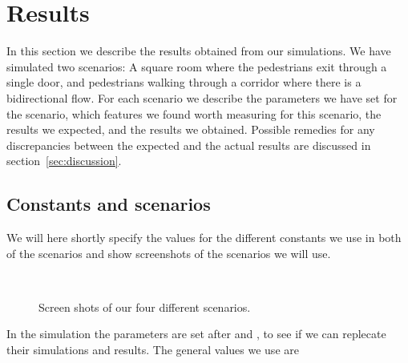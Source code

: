 \section{Results}
\label{sec:results}
In this section we describe the results obtained from our simulations. 
We have simulated two scenarios: A square room where the pedestrians 
exit through a single door, and pedestrians walking through a corridor 
where there is a bidirectional flow. For each scenario we describe the 
parameters we have set for the scenario, which features we found worth 
measuring for this scenario, the results we expected, and the results 
we obtained. Possible remedies for any discrepancies between the expected 
and the actual results are discussed in section~\ref{sec:discussion}.

\subsection{Constants and scenarios}
We will here shortly specify the values for the different constants 
we use in both of the scenarios and show screenshots of the scenarios 
we will use.

\begin{figure}[h]
\centering
{}
\\
\caption{Screen shots of our four different scenarios.}
\label{fig:fourcases}
\end{figure}

In the simulation the parameters are set after \cite{ABconstant} and 
\cite{self-org}, to see if we can replecate their simulations and results. 
The general values we use are


